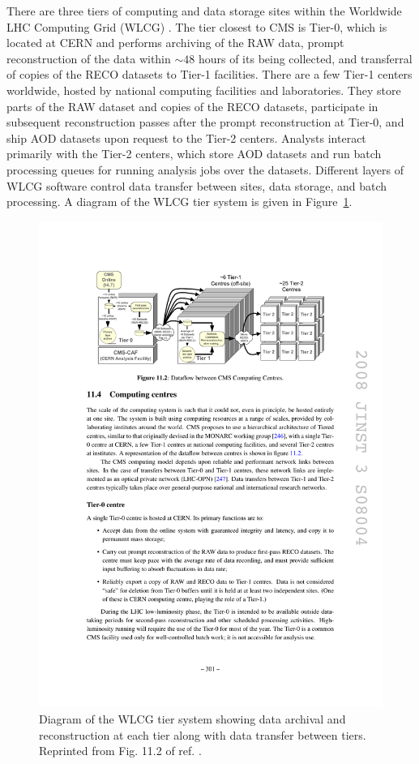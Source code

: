 \documentclass[dissertation.tex]{subfiles}
\begin{document}
There are three tiers of computing and data storage sites within the Worldwide LHC Computing Grid (WLCG) \cite{Eck:840543}.  The tier closest to CMS is Tier-0, which is located at CERN and performs archiving of the RAW data, prompt reconstruction of the data within $\sim48$ hours of its being collected, and transferral of copies of the RECO datasets to Tier-1 facilities.  There are a few Tier-1 centers worldwide, hosted by national computing facilities and laboratories.  They store parts of the RAW dataset and copies of the RECO datasets, participate in subsequent reconstruction passes after the prompt reconstruction at Tier-0, and ship AOD datasets upon request to the Tier-2 centers.  Analysts interact primarily with the Tier-2 centers, which store AOD datasets and run batch processing queues for running analysis jobs over the datasets.  Different layers of WLCG software control data transfer between sites, data storage, and batch processing.  A diagram of the WLCG tier system is given in Figure~\ref{fig:WLCG_diagram}.

\begin{figure}
	\centering
	\includegraphics[scale=1.0]{WLCG_diagram}
	\caption{Diagram of the WLCG tier system showing data archival and reconstruction at each tier along with data transfer between tiers.  Reprinted from Fig. 11.2 of ref. \cite{1748-0221-3-08-S08004}.}
	\label{fig:WLCG_diagram}
\end{figure}
\end{document}
